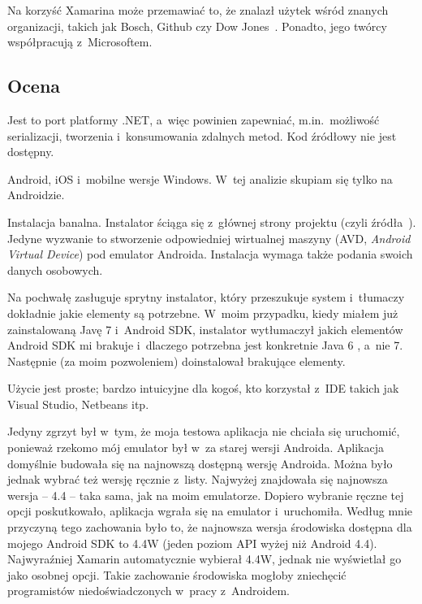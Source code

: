 Na korzyść Xamarina może przemawiać to, że znalazł użytek wśród znanych organizacji, takich jak Bosch, Github czy Dow Jones~\cite{xamarin-overview}.
Ponadto, jego twórcy współpracują z~Microsoftem.


\subsection{Ocena}

\begin{description}
Jest to port platformy .NET, a~więc powinien zapewniać, m.in.\ możliwość serializacji, tworzenia i~konsumowania zdalnych metod.
Kod źródłowy nie jest dostępny.

Android, iOS i~mobilne wersje Windows. W~tej analizie skupiam się tylko na Androidzie. 

Instalacja banalna. Instalator ściąga się z~głównej strony projektu (czyli źródła~\cite{xamarin-overview}).
Jedyne wyzwanie to stworzenie odpowiedniej wirtualnej maszyny (AVD, \emph{Android Virtual Device}) pod emulator Androida.
Instalacja wymaga także podania swoich danych osobowych.

Na pochwałę zasługuje sprytny instalator, który przeszukuje system i~tłumaczy dokładnie jakie elementy są potrzebne.
W~moim przypadku, kiedy miałem już zainstalowaną Javę 7 i~Android SDK, instalator wytłumaczył jakich elementów Android SDK mi brakuje i~dlaczego potrzebna jest konkretnie Java 6 , a~nie 7. Następnie (za moim pozwoleniem) doinstalował brakujące elementy.

Użycie jest proste; bardzo intuicyjne dla kogoś, kto korzystał z~IDE takich jak Visual Studio, Netbeans itp.

Jedyny zgrzyt był w~tym, że moja testowa aplikacja nie chciała się uruchomić, ponieważ rzekomo mój emulator był w~za starej wersji Androida.
Aplikacja domyślnie budowała się na najnowszą dostępną wersję Androida. Można było jednak wybrać też wersję ręcznie z~listy. Najwyżej znajdowała się najnowsza wersja -- 4.4 -- taka sama, jak na moim emulatorze. Dopiero wybranie ręczne tej opcji poskutkowało, aplikacja wgrała się na emulator i~uruchomiła. Według mnie przyczyną tego zachowania było to, że najnowsza wersja środowiska dostępna dla mojego Android SDK to 4.4W (jeden poziom API wyżej niż Android 4.4). Najwyraźniej Xamarin automatycznie wybierał 4.4W, jednak nie wyświetlał go jako osobnej opcji. Takie zachowanie środowiska mogłoby zniechęcić programistów niedoświadczonych w~pracy z~Androidem.


\end{description}
